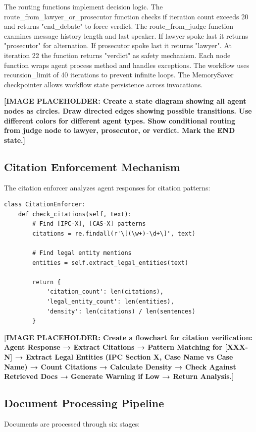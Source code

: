 \documentclass[12pt,singleside,a4paper]{article}
\begin{document}
The routing functions implement decision logic. The route\_from\_lawyer\_or\_prosecutor function checks if iteration count exceeds 20 and returns "end\_debate" to force verdict. The route\_from\_judge function examines message history length and last speaker. If lawyer spoke last it returns "prosecutor" for alternation. If prosecutor spoke last it returns "lawyer". At iteration 22 the function returns "verdict" as safety mechanism. Each node function wraps agent process method and handles exceptions. The workflow uses recursion\_limit of 40 iterations to prevent infinite loops. The MemorySaver checkpointer allows workflow state persistence across invocations.

\textbf{[IMAGE PLACEHOLDER: Create a state diagram showing all agent nodes as circles. Draw directed edges showing possible transitions. Use different colors for different agent types. Show conditional routing from judge node to lawyer, prosecutor, or verdict. Mark the END state.]}

\subsection{Citation Enforcement Mechanism}
The citation enforcer analyzes agent responses for citation patterns:

\begin{lstlisting}
class CitationEnforcer:
    def check_citations(self, text):
        # Find [IPC-X], [CAS-X] patterns
        citations = re.findall(r'\[(\w+)-\d+\]', text)
        
        # Find legal entity mentions
        entities = self.extract_legal_entities(text)
        
        return {
            'citation_count': len(citations),
            'legal_entity_count': len(entities),
            'density': len(citations) / len(sentences)
        }
\end{lstlisting}

\textbf{[IMAGE PLACEHOLDER: Create a flowchart for citation verification: Agent Response → Extract Citations → Pattern Matching for [XXX-N] → Extract Legal Entities (IPC Section X, Case Name vs Case Name) → Count Citations → Calculate Density → Check Against Retrieved Docs → Generate Warning if Low → Return Analysis.]}

\subsection{Document Processing Pipeline}
Documents are processed through six stages:
\end{document}
